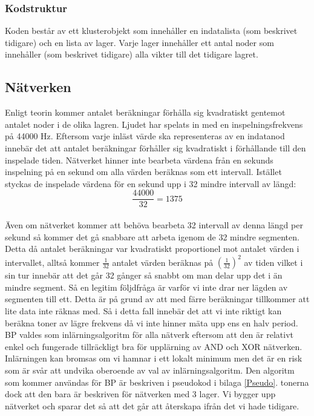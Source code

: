 \documentclass[a4paper,10pt]{article}
\begin{document}
\subsubsection{Kodstruktur}
Koden består av ett klusterobjekt som innehåller en indatalista (som beskrivet tidigare) och en lista av lager. Varje lager innehåller ett antal noder som innehåller (som beskrivet tidigare) alla vikter till det tidigare lagret.

\subsection{Nätverken}
Enligt teorin kommer antalet beräkningar förhålla sig kvadratiskt gentemot antalet noder i de olika lagren. Ljudet har spelats in med en inspelningsfrekvens på 44000 Hz. Eftersom varje inläst värde ska representeras av en indatanod innebär det att antalet beräkningar förhåller sig kvadratiskt i förhållande till den inspelade tiden. Nätverket hinner inte bearbeta värdena från en sekunds inspelning på en sekund om alla värden beräknas som ett intervall. Istället styckas de inspelade värdena för en sekund upp i 32 mindre intervall av längd: \\
	\[\dfrac{44000}{32} = 1375\]  \\
Även om nätverket kommer att behöva bearbeta 32 intervall av denna längd per sekund så kommer det gå snabbare att arbeta igenom de 32 mindre segmenten. Detta då antalet beräkningar var kvadratiskt proportionel mot antalet värden i intervallet, alltså kommer $\frac{1}{32}$ antalet värden beräknas på $(\frac{1}{32})^2$ av tiden vilket i sin tur innebär att det går 32 gånger så snabbt om man delar upp det i än mindre segment. Så en legitim följdfråga är varför vi inte drar ner lägden av segmenten till ett. Detta är på grund av att med färre beräkningar tillkommer att lite data inte räknas med. Så i detta fall innebär det att vi inte riktigt kan beräkna toner av lägre frekvens då vi inte hinner mäta upp ens en halv period. 
BP valdes som inlärningsalgoritm för alla nätverk eftersom att den är relativt enkel och fungerade tillräckligt bra för upplärning av AND och XOR nätverken. Inlärningen kan bromsas om vi hamnar i ett lokalt minimum\autocite{NNDL} men det är en risk som är svår att undvika oberoende av val av inlärningsalgoritm.
Den algoritm som kommer användas för BP är beskriven i pseudokod i bilaga \ref{Pseudo}. tonerna dock att den bara är beskriven för nätverken med 3 lager. Vi bygger upp nätverket och sparar det så att det går att återskapa ifrån det vi hade tidigare. 
\end{document}
